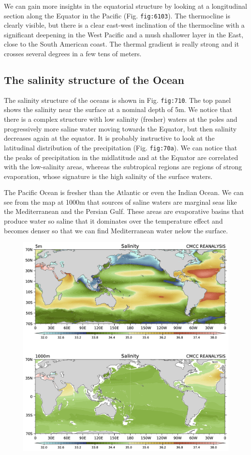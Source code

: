 We can gain more insights in the equatorial structure by looking at a
longitudinal section along the Equator in the Pacific (Fig.
\texttt{fig:6103}). The thermocline is clearly visible, but there is a
clear east-west inclination of the thermocline with a significant
deepening in the West Pacific and a mush shallower layer in the East,
close to the South American coast. The thermal gradient is really strong
and it crosses several degrees in a few tens of meters.

\subsection{The salinity structure of the
Ocean}\label{the-salinity-structure-of-the-ocean}

The salinity structure of the oceans is shown in Fig. \texttt{fig:710}.
The top panel shows the salinity near the surface at a nominal depth of
5m. We notice that there is a complex structure with low salinity
(fresher) waters at the poles and progressively more saline water moving
towards the Equator, but then salinity decreases again at the equator.
It is probably instructive to look at the latitudinal distribution of
the precipitation (Fig. \texttt{fig:70a}). We can notice that the peaks
of precipitation in the midlatitude and at the Equator are correlated
with the low-salinity areas, whereas the subtropical regions are regions
of strong evaporation, whose signature is the high salinity of the
surface waters.

The Pacific Ocean is fresher than the Atlantic or even the Indian Ocean.
We can see from the map at 1000m that sources of saline waters are
marginal seas like the Mediterranean and the Persian Gulf. These areas
are evaporative basins that produce water so saline that it dominates
over the temperature effect and becomes denser so that we can find
Mediterranean water nelow the surface.

\begin{figure}
\centering
\includegraphics[width = .7 \textwidth]{figs/GD/Sal5-1000.png}
\caption{} \label{fig:}
\end{figure}

